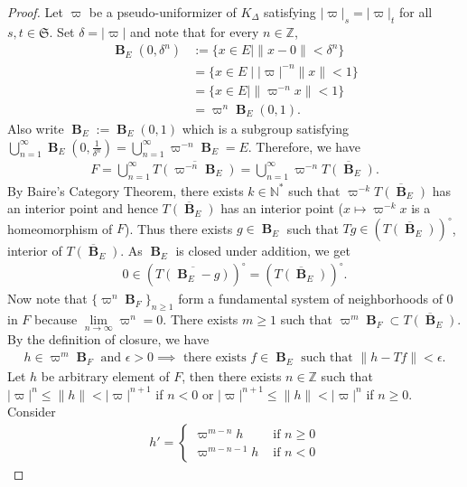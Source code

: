 \documentclass[12pts,a4paper]{amsart}
\DeclareMathOperator{\B}{\textbf{B}}
\begin{document}
\begin{proof}
	Let $\varpi$ be a pseudo-uniformizer of $K_\Delta$ satisfying $|\varpi|_s=|\varpi|_t$ for all $s,t\in\mathfrak{S}$.  Set $\delta=|\varpi|$ and note that for every $n\in\mathbb{Z}$,
	\begin{align*}
		\B_E(0,\delta^n)&:=\{x\in E\mid \|x-0\|<\delta^n\}\\
		                        &=\{x\in E\mid |\varpi|^{-n}\|x\|<1\}\\
		                        &=\{x\in E\mid \|\varpi^{-n}x\|<1\}\\
		                        &=\varpi^n\B_E(0,1).
	\end{align*}
	Also write $\B_E:=\B_E(0,1)$ which is a subgroup satisfying $\bigcup\limits_{n=1}^\infty\B_E\left(0,\frac{1}{\delta^n}\right)=\bigcup\limits_{n=1}^\infty\varpi^{-n}\B_E=E$. Therefore, we have
	\begin{align*}
		F=\bigcup\limits_{n=1}^\infty \overline{T(\varpi^{-n}\B_E)}=\bigcup\limits_{n=1}^\infty \varpi^{-n}\overline{T(\B_E)}.
	\end{align*}
	By Baire's Category Theorem, there exists $k\in\mathbb{N}^*$ such that $\varpi^{-k}\overline{T(\B_E)}$ has an interior point and hence $\overline{T(\B_E)}$ has an interior point ($x\mapsto \varpi^{-k}x$ is a homeomorphism of $F$). Thus there exists $g\in\B_E$ such that $Tg\in\left(\overline{T(\B_E)}\right)^\circ$, interior of $\overline{T(\B_E)}$. As $\B_E$ is closed under addition, we get
	\begin{align*}
		0\in\left(\overline{T(\B_E-g)}\right)^\circ=\left(\overline{T(\B_E)}\right)^\circ.
	\end{align*}
	Now note that $\{\varpi^n\B_F\}_{n\geq 1}$ form a fundamental system of neighborhoods of $0$ in $F$ because $\lim\limits_{n\to\infty}\varpi^n=0$. There exists $m\geq 1$ such that $\varpi^m\B_F\subset \overline{T(\B_E)}$. By the definition of closure, we have
	\begin{align*}
		h\in\varpi^m\B_F\text{ and }\epsilon>0\implies \text{ there exists } f\in\B_E\text{ such that }\|h-Tf\|<\epsilon.
	\end{align*}
	Let $h$ be arbitrary element of $F$, then there exists $n\in\mathbb{Z}$ such that $|\varpi|^n\leq \|h\|<|\varpi|^{n+1}$ if $n<0$ or $|\varpi|^{n+1}\leq\|h\|<|\varpi|^n$ if $n\geq 0$. Consider
	\begin{align*}
		h'=
		\begin{cases}
			\varpi^{m-n}h &\text{ if } n\geq 0\\
			\varpi^{m-n-1}h &\text{ if } n<0

\end{cases}
\end{align*}
\end{proof}
\end{document}
